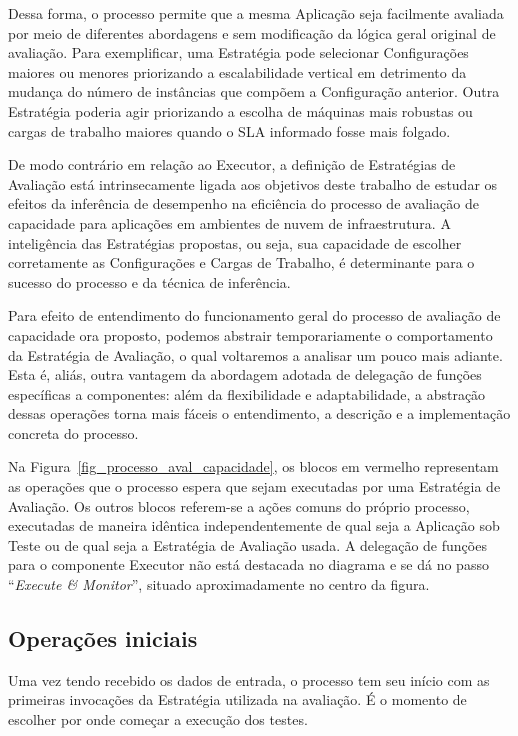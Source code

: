 Dessa forma, o processo permite que a mesma Aplicação seja facilmente avaliada 
por meio de diferentes abordagens e sem modificação da lógica geral original de 
avaliação. Para exemplificar, uma Estratégia pode selecionar Configurações 
maiores ou menores priorizando a escalabilidade vertical em detrimento da mudança
do número de instâncias que compõem a Configuração anterior. Outra Estratégia 
poderia agir priorizando a escolha de máquinas mais robustas ou cargas de trabalho
maiores quando o SLA informado fosse mais folgado.

De modo contrário em relação ao Executor, a definição de Estratégias de Avaliação
está intrinsecamente ligada aos objetivos deste trabalho de estudar os efeitos da
inferência de desempenho na eficiência do processo de avaliação de capacidade para
aplicações em ambientes de nuvem de infraestrutura. A inteligência das Estratégias
propostas, ou seja, sua capacidade de escolher corretamente as Configurações e 
Cargas de Trabalho, é determinante para o sucesso do processo e da técnica de 
inferência. 

Para efeito de entendimento do funcionamento geral do processo de avaliação de 
capacidade ora proposto, podemos abstrair temporariamente o comportamento da 
Estratégia de Avaliação, o qual voltaremos a analisar um pouco mais adiante. 
Esta é, aliás, outra vantagem da abordagem adotada de delegação de funções 
específicas a componentes: além da flexibilidade e adaptabilidade, a abstração 
dessas operações torna mais fáceis o entendimento, a descrição e a implementação 
concreta do processo.   

Na Figura~\ref{fig_processo_aval_capacidade}, os blocos em vermelho representam
as operações que o processo espera que sejam executadas por uma Estratégia de 
Avaliação. Os outros blocos referem-se a ações comuns do próprio processo, 
executadas de maneira idêntica independentemente de qual seja a Aplicação sob Teste
ou de qual seja a Estratégia de Avaliação usada. A delegação de funções para o 
componente Executor não está destacada no diagrama e se dá no passo 
``\emph{Execute \& Monitor}'', situado aproximadamente no centro da figura.

\subsection{Operações iniciais}
Uma vez tendo recebido os dados de entrada, o processo tem seu início com as 
primeiras invocações da Estratégia utilizada na avaliação. É o momento de escolher
por onde começar a execução dos testes.

